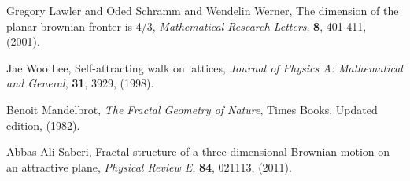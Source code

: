 \documentclass[11pt]{article}
\begin{document}
\begin{thebibliography}{999}
  Gregory Lawler and Oded Schramm and Wendelin Werner,
  The dimension of the planar brownian fronter is 4/3,
  \emph{Mathematical Research Letters},
  \textbf{8},
  401-411,
  (2001).

  Jae Woo Lee,
  Self-attracting walk on lattices,
  \emph{Journal of Physics A: Mathematical and General},
  \textbf{31},
  3929,
  (1998).

  Benoit Mandelbrot,
  \emph{The Fractal Geometry of Nature},
  Times Books, Updated edition,
  (1982).
  
  Abbas Ali Saberi,
  Fractal structure of a three-dimensional Brownian motion on an attractive plane,
  \emph{Physical Review E},
  \textbf{84},
  021113,
  (2011).
\end{thebibliography}
\end{document}

